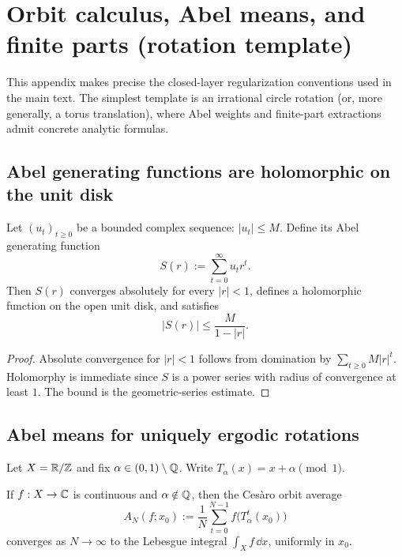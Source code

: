 
\section{Orbit calculus, Abel means, and finite parts (rotation template)}
\label{app:orbit_abel}

This appendix makes precise the closed-layer regularization conventions used in the main text.
The simplest template is an irrational circle rotation (or, more generally, a torus translation), where Abel weights and finite-part extractions admit concrete analytic formulas.

\subsection{Abel generating functions are holomorphic on the unit disk}
\label{app:abel_holomorphic}

\begin{proposition}
\label{prop:abel_holomorphic}
Let $(u_t)_{t\ge 0}$ be a bounded complex sequence: $|u_t|\le M$.
Define its Abel generating function
\[
S(r):=\sum_{t=0}^{\infty} u_t r^t.
\]
Then $S(r)$ converges absolutely for every $|r|<1$, defines a holomorphic function on the open unit disk, and satisfies
\[
|S(r)|\le \frac{M}{1-|r|}.
\]
\end{proposition}

\begin{proof}
Absolute convergence for $|r|<1$ follows from domination by $\sum_{t\ge 0} M|r|^t$.
Holomorphy is immediate since $S$ is a power series with radius of convergence at least $1$.
The bound is the geometric-series estimate.
\end{proof}

\subsection{Abel means for uniquely ergodic rotations}
\label{app:abel_mean_unique_ergodic}

Let $X=\mathbb{R}/\mathbb{Z}$ and fix $\alpha\in(0,1)\setminus\mathbb{Q}$.
Write $T_\alpha(x)=x+\alpha\pmod{1}$.

\begin{theorem}
\label{thm:orbit_trace_rotation}
If $f:X\to\mathbb{C}$ is continuous and $\alpha\notin\mathbb{Q}$, then the Ces\`aro orbit average
\[
A_N(f;x_0):=\frac{1}{N}\sum_{t=0}^{N-1} f\bigl(T_\alpha^t(x_0)\bigr)
\]
converges as $N\to\infty$ to the Lebesgue integral $\int_X f\,\dd x$, uniformly in $x_0$.
\end{theorem}


